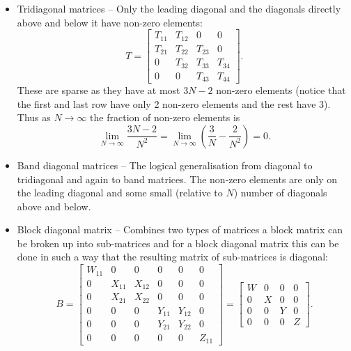\documentclass[a4paper]{article}
\begin{document}
\begin{itemize}
\begin{itemize}
            \item Tridiagonal matrices -- Only the leading diagonal and the diagonals directly above and below it have non-zero elements:
            \[
                T =
                \begin{bmatrix}
                	T_{11} & T_{12} & 0      & 0      \\
                	T_{21} & T_{22} & T_{23} & 0      \\
                	0      & T_{32} & T_{33} & T_{34} \\
                	0      & 0      & T_{43} & T_{44}
                \end{bmatrix}
                .
            \]
            These are sparse as they have at most \(3N - 2\) non-zero elements (notice that the first and last row have only 2 non-zero elements and the rest have 3).
            Thus as \(N\to\infty\) the fraction of non-zero elements is
            \[\lim_{N\to\infty}\frac{3N - 2}{N^2} = \lim_{N\to\infty}\left(\frac{3}{N} - \frac{2}{N^2}\right) = 0.\]
            
            \item Band diagonal matrices -- The logical generalisation from diagonal to tridiagonal and again to band matrices.
            The non-zero elements are only on the leading diagonal and some small (relative to \(N\)) number of diagonals above and below.
            
            \item Block diagonal matrix -- Combines two types of matrices a block matrix can be broken up into sub-matrices and for a block diagonal matrix this can be done in such a way that the resulting matrix of sub-matrices is diagonal:
            \[
                B = 
                \begin{bmatrix}
                	W_{11} & 0      & 0      & 0      & 0      & 0      \\
                	0      & X_{11} & X_{12} & 0      & 0      & 0      \\
                	0      & X_{21} & X_{22} & 0      & 0      & 0      \\
                	0      & 0      & 0      & Y_{11} & Y_{12} & 0      \\
                	0      & 0      & 0      & Y_{21} & Y_{22} & 0      \\
                	0      & 0      & 0      & 0      & 0      & Z_{11}
                \end{bmatrix}
                =
                \begin{bmatrix}
                	W & 0 & 0 & 0 \\
                	0 & X & 0 & 0 \\
                	0 & 0 & Y & 0 \\
                	0 & 0 & 0 & Z
                \end{bmatrix}
                .
            \]
        \end{itemize}
    \end{itemize}
\end{document}
